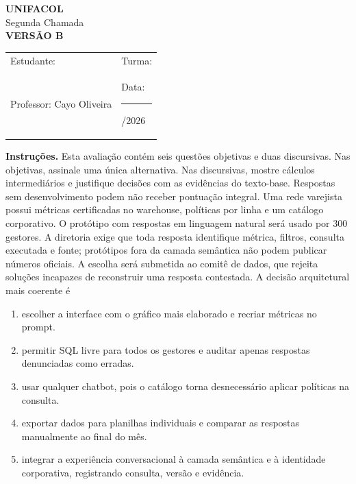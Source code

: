 \documentclass[12pt,a4paper]{article}
\begin{document}
\begin{center}
{\Large\bfseries UNIFACOL}\\[2mm]
{\large Segunda Chamada}\\[1mm]
{\Large\bfseries VERSÃO B}
\end{center}
\begin{DocumentBox}[Identificação]
\begin{tabularx}{\textwidth}{@{}p{}p{}@{}}
Estudante: \hrulefill & Turma: \hrulefill\\[3mm]
Professor: Cayo Oliveira & Data: \rule{2.7cm}{.2pt}/2026
\end{tabularx}
\end{DocumentBox}
\textbf{Instruções.} Esta avaliação contém seis questões objetivas e duas discursivas. Nas objetivas, assinale uma única alternativa. Nas discursivas, mostre cálculos intermediários e justifique decisões com as evidências do texto-base. Respostas sem desenvolvimento podem não receber pontuação integral.
\bigskip
\TextoBase
Uma rede varejista possui métricas certificadas no warehouse, políticas por linha e um catálogo corporativo. O protótipo com respostas em linguagem natural será usado por 300 gestores. A diretoria exige que toda resposta identifique métrica, filtros, consulta executada e fonte; protótipos fora da camada semântica não podem publicar números oficiais.
A escolha será submetida ao comitê de dados, que rejeita soluções incapazes de reconstruir uma resposta contestada.
\FonteDidatica
\Comando A decisão arquitetural mais coerente é
\begin{enumerate}[label=\Alph*)]
  \item escolher a interface com o gráfico mais elaborado e recriar métricas no prompt.
  \item permitir SQL livre para todos os gestores e auditar apenas respostas denunciadas como erradas.
  \item usar qualquer chatbot, pois o catálogo torna desnecessário aplicar políticas na consulta.
  \item exportar dados para planilhas individuais e comparar as respostas manualmente ao final do mês.
  \item integrar a experiência conversacional à camada semântica e à identidade corporativa, registrando consulta, versão e evidência.
\end{enumerate}
\end{document}
